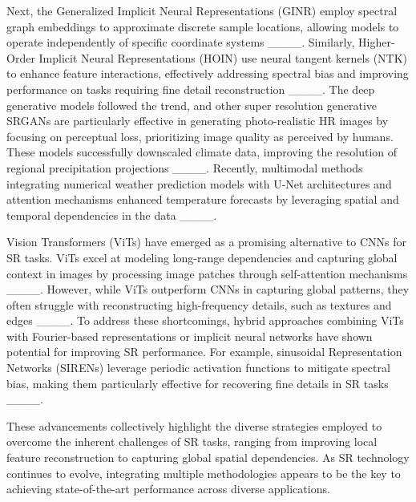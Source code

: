Next, the Generalized Implicit Neural Representations (GINR) employ spectral graph embeddings to approximate discrete sample locations, allowing models to operate independently of specific coordinate systems ____. Similarly, Higher-Order Implicit Neural Representations (HOIN) use neural tangent kernels (NTK) to enhance feature interactions, effectively addressing spectral bias and improving performance on tasks requiring fine detail reconstruction ____. The deep generative models followed the trend, and other super resolution generative SRGANs are particularly effective in generating photo-realistic HR images by focusing on perceptual loss, prioritizing image quality as perceived by humans. These models successfully downscaled climate data, improving the resolution of regional precipitation projections ____. Recently, multimodal methods integrating numerical weather prediction models with U-Net architectures and attention mechanisms enhanced temperature forecasts by leveraging spatial and temporal dependencies in the data ____.

Vision Transformers (ViTs) have emerged as a promising alternative to CNNs for SR tasks. ViTs excel at modeling long-range dependencies and capturing global context in images by processing image patches through self-attention mechanisms ____. However, while ViTs outperform CNNs in capturing global patterns, they often struggle with reconstructing high-frequency details, such as textures and edges ____. To address these shortcomings, hybrid approaches combining ViTs with Fourier-based representations or implicit neural networks have shown potential for improving SR performance. For example, sinusoidal Representation Networks (SIRENs) leverage periodic activation functions to mitigate spectral bias, making them particularly effective for recovering fine details in SR tasks ____.

These advancements collectively highlight the diverse strategies employed to overcome the inherent challenges of SR tasks, ranging from improving local feature reconstruction to capturing global spatial dependencies. As SR technology continues to evolve, integrating multiple methodologies appears to be the key to achieving state-of-the-art performance across diverse applications.